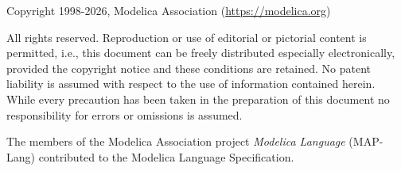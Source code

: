 Copyright \textcopyright{} 1998-2026, Modelica Association (\url{https://modelica.org})

All rights reserved.
Reproduction or use of editorial or pictorial content is permitted, i.e., this document can be freely distributed especially electronically, provided the copyright notice and these conditions are retained.
No patent liability is assumed with respect to the use of information contained herein.
While every precaution has been taken in the preparation of this document no responsibility for errors or omissions is assumed.

The members of the Modelica Association project \emph{Modelica Language} (MAP-Lang) contributed to the Modelica Language Specification.
